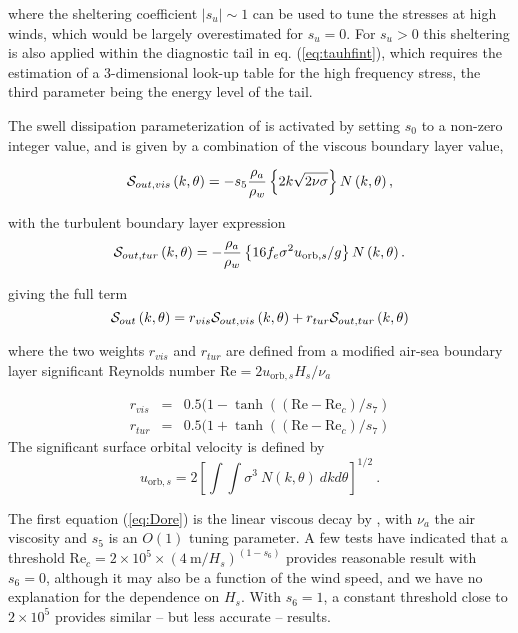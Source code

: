 \noindent
where the sheltering coefficient $\left|s_u\right|\sim 1$ can be used to tune
the stresses at high winds, which would be largely overestimated for
$s_u=0$. For $s_u > 0$ this sheltering is also applied within the diagnostic
tail in eq. (\ref{eq:tauhfint}), which requires the estimation of a
3-dimensional look-up table for the high frequency stress, the third parameter
being the energy level of the tail.

The swell dissipation parameterization of \cite{art:ACC08} is activated by setting $s_0$ to a non-zero integer value, and is given
by a combination of the viscous boundary layer value, 

\begin{equation}
{\cal S}_{out,vis}\left(k,\theta\right) = - s_5 \frac{\rho_a}{\rho_w}\left\{ 2 k \sqrt{2
\nu \sigma}\right\}  N \left(k,\theta\right) \label{Sds_turb},\label{eq:Dore}
\end{equation}

\noindent
with the turbulent boundary layer expression 
\begin{equation}
{\cal S}_{out,tur} \left(k,\theta\right) = - \frac{\rho_a}{\rho_w}\left\{  16 f_e
\sigma^2 u_{\mathrm{orb},s} / g \right\}
 N\left(k,\theta\right) \label{Sds_visc}.\label{eq:swell_turb}
\end{equation}

\noindent
giving the full term 
\begin{equation}
{\cal S}_{out} \left(k,\theta\right) = r_{vis} {\cal S}_{out,vis}\left(k,\theta\right)  + 
 r_{tur} {\cal S}_{out,tur}\left(k,\theta\right)  
 \label{eq:swell_comb}
\end{equation}

\noindent
where the two weights $ r_{vis} $ and $r_{tur}$ are defined from 
a modified  air-sea boundary layer significant Reynolds number $\mathrm{Re} = 2
u_{\mathrm{orb},s} H_s / \nu_{a}$ 

\begin{eqnarray}
 r_{vis} &=& 0.5 (1- \tanh((\mathrm{Re}-\mathrm{Re}_{c})/s_7) \\
 r_{tur}&=& 0.5 (1+ \tanh((\mathrm{Re}-\mathrm{Re}_{c})/s_7) 
\end{eqnarray}
The significant surface orbital velocity is defined by
\begin{equation} u_{\mathrm{orb},s} = 2 \left [  \int \!\!\!\! \int
      \sigma^3 \: N(k,\theta) \: dk d\theta \right ] ^{1/2}
      \: . \label{eq:ub_orbs} \end{equation}

\noindent
The first equation (\ref{eq:Dore}) is the linear viscous decay by
\cite{art:Dore78}, with $\nu_a$ the air viscosity and $s_5$ is an $O(1)$
tuning parameter. A few tests have indicated that a threshold Re$_{c}=2 \times 10^5 \times (4~\mathrm{m}/H_s)^{(1-s_6)}$ provides reasonable result with 
$s_6=0$, although it may also be a function of the wind speed, and we have no explanation for the dependence on $H_s$. 
With $s_6=1$, a constant threshold close to $2 \times 10^5$ provides similar -- but less accurate -- results. 


